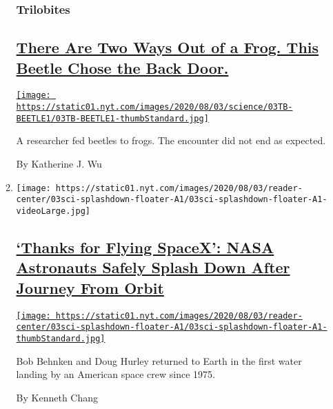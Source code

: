 \begin{enumerate}
\begin{enumerate}
    \hypertarget{trilobites}{%
    \subsubsection{Trilobites}\label{trilobites}}

    \hypertarget{there-are-two-ways-out-of-a-frog-this-beetle-chose-the-back-door}{%
    \subsection{\texorpdfstring{\href{/2020/08/03/science/beetle-frog-poop.html}{There
    Are Two Ways Out of a Frog. This Beetle Chose the Back
    Door.}}{There Are Two Ways Out of a Frog. This Beetle Chose the Back Door.}}\label{there-are-two-ways-out-of-a-frog-this-beetle-chose-the-back-door}}

    \href{/2020/08/03/science/beetle-frog-poop.html}{\texttt{[image: https://static01.nyt.com/images/2020/08/03/science/03TB-BEETLE1/03TB-BEETLE1-thumbStandard.jpg]}}

    A researcher fed beetles to frogs. The encounter did not end as
    expected.

    By Katherine J. Wu
  \item
    \texttt{[image: https://static01.nyt.com/images/2020/08/03/reader-center/03sci-splashdown-floater-A1/03sci-splashdown-floater-A1-videoLarge.jpg]}

    \hypertarget{thanks-for-flying-spacex-nasa-astronauts-safely-splash-down-after-journey-from-orbit}{%
    \subsection{\texorpdfstring{\href{/2020/08/02/science/spacex-astronauts-splashdown.html}{`Thanks
    for Flying SpaceX': NASA Astronauts Safely Splash Down After Journey
    From
    Orbit}}{`Thanks for Flying SpaceX': NASA Astronauts Safely Splash Down After Journey From Orbit}}\label{thanks-for-flying-spacex-nasa-astronauts-safely-splash-down-after-journey-from-orbit}}

    \href{/2020/08/02/science/spacex-astronauts-splashdown.html}{\texttt{[image: https://static01.nyt.com/images/2020/08/03/reader-center/03sci-splashdown-floater-A1/03sci-splashdown-floater-A1-thumbStandard.jpg]}}

    Bob Behnken and Doug Hurley returned to Earth in the first water
    landing by an American space crew since 1975.

    By Kenneth Chang
  \end{enumerate}
\end{enumerate}

